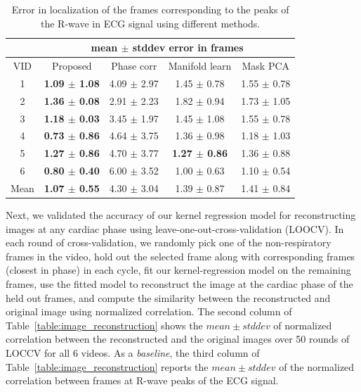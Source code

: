 \documentclass[journal]{IEEEtran}
\begin{document}
%
\vspace{-0.3cm}
\begin{table}[h]
\begin{minipage}[t]{0.95\linewidth}
\centering
\caption{Error in localization of the frames corresponding to the peaks of the R-wave in ECG signal using different methods.}
\setlength\tabcolsep{3pt} 
\begin{tabular}{|c|c|c|c|c|}
\hline
\multicolumn{1}{|l|}{} & \multicolumn{4}{c|}{mean $\pm$ stddev error in frames} \\ \hline
VID & Proposed & Phase corr\cite{Karadayi2006} & Manifold learn\cite{Wachinger2012} & Mask PCA\cite{Panayiotou2014} \\ \hline
1 & \bf{1.09 $\pm$ 1.08} & 4.09 $\pm$ 2.97 & 1.45 $\pm$ 0.78 & 1.55 $\pm$ 0.78 \\ \hline
2 & \bf{1.36 $\pm$ 0.08} & 2.91 $\pm$ 2.23 & 1.82 $\pm$ 0.94 & 1.73 $\pm$ 1.05 \\ \hline
3 & \bf{1.18 $\pm$ 0.03} & 3.45 $\pm$ 1.97 & 1.45 $\pm$ 1.08 & 1.55 $\pm$ 0.78 \\ \hline
4 & \bf{0.73 $\pm$ 0.86} & 4.64 $\pm$ 3.75 & 1.36 $\pm$ 0.98 & 1.18 $\pm$ 1.03 \\ \hline
5 & \bf{1.27 $\pm$ 0.86} & 4.70 $\pm$ 3.77 & \bf{1.27 $\pm$ 0.86} & 1.36 $\pm$ 0.88 \\ \hline
6 & \bf{0.80 $\pm$ 0.40} & 6.00 $\pm$ 3.52 & 1.00 $\pm$ 0.63 & 1.10 $\pm$ 0.54 \\ \hline \hline
Mean & \bf{1.07 $\pm$ 0.55} & 4.30 $\pm$ 3.04 & 1.39 $\pm$ 0.87 & 1.41 $\pm$ 0.84\\
\hline
\end{tabular}
\label{table:R_peak_localization}
\end{minipage}
\end{table}
%	

Next, we validated the accuracy of our kernel regression model for reconstructing images at any cardiac phase using leave-one-out-cross-validation (LOOCV). In each round of cross-validation, we randomly pick one of the non-respiratory frames in the video, hold out the selected frame along with corresponding frames (closest in phase) in each cycle, fit our kernel-regression model on the remaining frames, use the fitted model to reconstruct the image at the cardiac phase of the held out frames, and compute the similarity between the reconstructed and original image using normalized correlation. The second column of Table~\ref{table:image_reconstruction} shows the $mean \pm stddev$ of normalized correlation between the reconstructed and the original images over 50 rounds of LOCCV for all 6 videos. As a \emph{baseline}, the third column of Table~\ref{table:image_reconstruction} reports the $mean \pm stddev$ of the normalized correlation between frames at R-wave peaks of the ECG signal. 
\end{document}
